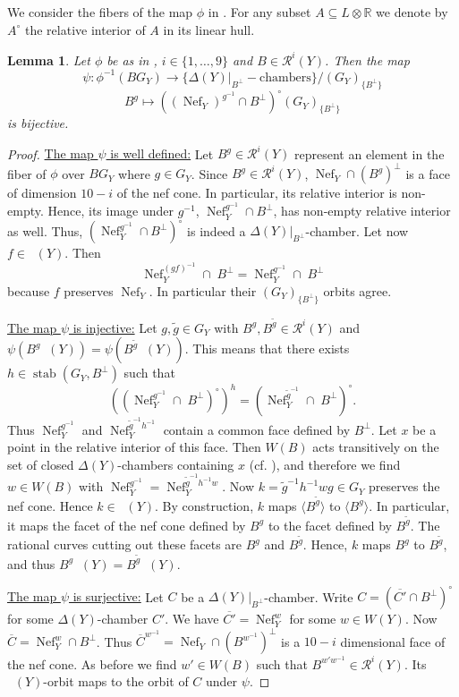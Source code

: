 \documentclass[a4paper]{amsart}
\theoremstyle{definition}
\theoremstyle{plain}
\newtheorem{lemma}[definition]{Lemma}
\DeclareMathOperator{\Nef}{Nef}
\DeclareMathOperator{\aut}{Aut^*}
\DeclareMathOperator{\stab}{stab}
\newcommand{\RR}{\mathbb{R}}
\newcommand{\R}{\mathcal{R}}
\begin{document}
We consider the fibers of the map $\phi$ in .
For any subset $A \subseteq L\otimes \RR$ we denote by $A^\circ$ the relative interior of $A$ in its linear hull.
\begin{lemma}\label{lem:phi-fiber}
Let $\phi$ be as in , $i \in \{1,\dots, 9\}$ and $B \in \R^i(Y)$.
Then the map
\[\psi\colon \phi^{-1}(B G_Y) \to \{\Delta(Y)|_{B^\perp}-\mbox{chambers}\}/
(G_Y)_{\{B^\perp\}}\]
\[B^g \mapsto \left((\Nef_Y)^{g^{-1}}\cap B^\perp\right)^\circ(G_Y)_{\{B^\perp\}}\]
is bijective.
\end{lemma}
\begin{proof}
\underline{The map $\psi$ is well defined:} Let $B^g \in \R^i(Y)$  represent an element in the fiber of $\phi$ over $BG_Y$  where $g\in G_Y$.
Since $B^g \in \R^i(Y)$, \(\Nef_Y \cap (B^g)^\perp\) is a face of dimension $10-i$ of the nef cone.
In particular, its relative interior is non-empty. Hence, its image under $g^{-1}$, $\Nef_Y^{g^{-1}}\cap B^\perp$, has non-empty relative interior as well.
Thus, $\left(\Nef_Y^{g^{-1}}\cap B^\perp\right)^{\circ}$ is indeed a $\Delta(Y)|_{B^\perp}$-chamber. Let now $f \in \aut(Y)$. Then 
\[\Nef_Y^{(gf)^{-1}}\cap \; B^\perp = \Nef_Y^{g^{-1}} \cap\; B^\perp\] because $f$ preserves $\Nef_Y$. In particular their $(G_Y)_{\{B^\perp\}}$ orbits agree. 

\underline{The map $\psi$ is injective:}
Let \(g,\widetilde{g} \in G_Y \) with \(B^g,B^{\widetilde{g}} \in \R^{i}(Y)\)
and \(\psi(B^g\aut(Y)) = \psi(B^{\widetilde{g}}\aut(Y))\).
This means that there exists $h \in \stab(G_Y,B^\perp)$ such that
\[\left(\left(\Nef_Y^{g^{-1}}\cap \;B^\perp\right)^\circ \right)^h = \left(\Nef_Y^{\widetilde{g}^{-1}}\cap\; B^\perp\right)^\circ.\]
Thus $\Nef_Y^{g^{-1}}$ and $ \Nef_Y^{\widetilde{g}^{-1}h^{-1}}$ contain a common face defined by $B^\perp$. Let $x$ be a point in the relative interior of this face. Then $W(B)$ acts transitively on the set of closed $\Delta(Y)$-chambers containing $x$ (cf. \cite[Lemma 4.2]{brandhorst-gonzalez:527}), and therefore we find $w \in W(B)$ with
 $\Nef_Y^{g^{-1}}=\Nef_Y^{\widetilde{g}^{-1}h^{-1}w}$.
Now $k = \widetilde{g}^{-1}h^{-1}wg \in G_Y$ preserves the nef cone. Hence $k \in \aut(Y)$.
By construction, $k$ maps $\langle B^{\widetilde{g}}\rangle $ to $\langle B^g \rangle$. In particular, it maps the facet of the nef cone defined by $B^g$ to the facet defined by $B^{\widetilde{g}}$.
The rational curves cutting out these facets are $B^g$ and $B^{\widetilde{g}}$. Hence, $k$ maps $B^g$ to $B^{\widetilde{g}}$, and thus $B^g\aut(Y)=B^{\widetilde{g}}\aut(Y)$.

\underline{The map $\psi$ is surjective:}
Let $C$ be a $\Delta(Y)|_{B^\perp}$-chamber. Write $C = \left(\overline{C'}\cap B^\perp\right)^\circ$ for some $\Delta(Y)$-chamber $C'$. We have $\overline{C'} = \Nef_Y^w$ for some $w \in W(Y)$. Now $\overline{C} = \Nef_Y^w \cap B^\perp$. Thus $\overline{C}^{w^{-1}}= \Nef_Y \cap (B^{w^{-1}})^\perp$ is a $10-i$ dimensional face of the nef cone. As before we find $w' \in W(B)$ such that $B^{w'w^{-1}} \in \R^i(Y)$.
Its $\aut(Y)$-orbit maps to the orbit of $C$ under $\psi$.
\end{proof}
\end{document}
